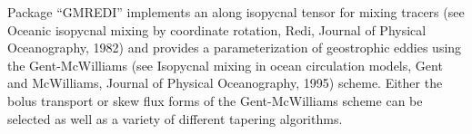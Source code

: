 
Package ``GMREDI'' implements an along isopycnal tensor for mixing tracers
(see Oceanic isopycnal mixing by coordinate rotation, Redi,
Journal of Physical Oceanography, 1982) and provides a parameterization of 
geostrophic eddies 
using the Gent-McWilliams (see Isopycnal mixing in ocean circulation
models, Gent and McWilliams, Journal of Physical Oceanography, 1995) scheme. 
Either the bolus transport or skew flux forms of the Gent-McWilliams scheme 
can be selected as well as a variety of different tapering algorithms.
